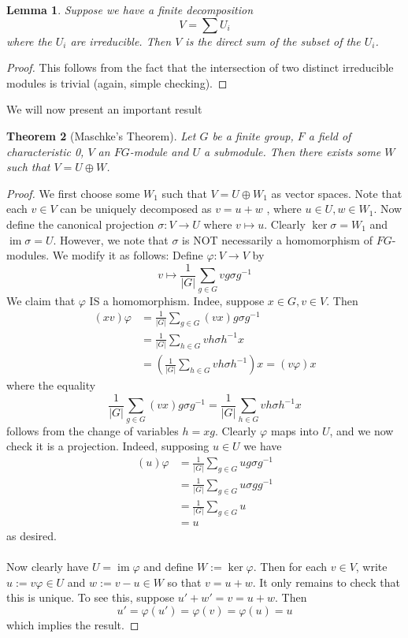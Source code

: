 \documentclass[11pt, notitlepage]{article}
\numberwithin{equation}{section}
\theoremstyle{plain}
\newtheorem{theorem}{Theorem}[section]
\newtheorem{lemma}[theorem]{Lemma}
\theoremstyle{definition}
\DeclareMathOperator{\im}{im}
\begin{document}
\begin{lemma}
	Suppose we have a finite decomposition $$V = \sum U_i$$ where the $U_i$ are irreducible. Then $V$ is the direct sum of the subset of the $U_i$. 
\end{lemma}
\begin{proof}
	This follows from the fact that the intersection of two distinct irreducible modules is trivial (again, simple checking).
\end{proof}

We will now present an important result
\begin{theorem} [Maschke's Theorem]
	Let $G$ be a finite group, $F$ a field of characteristic 0, $V$ an $FG$-module and $U$ a submodule. Then there exists some $W$ such that $V = U \oplus W$.
\end{theorem}
\begin{proof}
	We first choose some $W_1$ such that $V = U \oplus W_1$ as vector spaces. Note that each $v\in V$ can be uniquely decomposed as $v = u + w$ , where $u\in U, w\in W_1$. Now define the canonical projection $\sigma: V \rightarrow U$ where $v \mapsto u$. Clearly $\ker \sigma = W_1$ and $\im \sigma = U$. However, we note that $\sigma$ is NOT necessarily a homomorphism of $FG$-modules. We modify it as follows: Define $\varphi: V \rightarrow V$ by $$v\mapsto \frac{1}{{|G|}} \sum_{g\in G} vg\sigma g^{-1}$$ We claim that $\varphi$ IS a homomorphism. Indee, suppose $x\in G, v\in V$. Then 
	\begin{align*}
		(xv)\varphi &= \frac{1}{{|G|}} \sum_{g\in G} (vx)g\sigma g^{-1}\\
		&= \frac{1}{{|G|}} \sum_{h\in G} vh\sigma h^{-1}x \\
		&= \left(\frac{1}{{|G|}} \sum_{h\in G} vh\sigma h^{-1}\right)x = (v\varphi)x
	\end{align*}
	where the equality $$\frac{1}{{|G|}} \sum_{g\in G} (vx)g\sigma g^{-1}= \frac{1}{{|G|}} \sum_{h\in G} vh\sigma h^{-1}x$$ follows from the change of variables $h = xg$. Clearly $\varphi$ maps into $U$, and we now check it is a projection. Indeed, supposing $u\in U$ we have 
	\begin{align*}
		(u)\varphi &= \frac{1}{{|G|}} \sum_{g\in G} ug\sigma g^{-1} \\
		&= \frac{1}{{|G|}} \sum_{g\in G} u\sigma gg^{-1} \\
		&= \frac{1}{{|G|}} \sum_{g\in G} u\\
		&= u
	\end{align*}
	as desired. 
	\\\\
	Now clearly have $U = \im \varphi$ and define $W:= \ker \varphi$. Then for each $v\in V$, write $u:= v\varphi \in U$ and $w:= v - u\in W$ so that $v = u + w$. It only remains to check that this is unique. To see this, suppose $u' + w' = v = u + w$. Then $$u' = \varphi(u') = \varphi(v) = \varphi(u) = u$$ which implies the result.
\end{proof}
\end{document}

